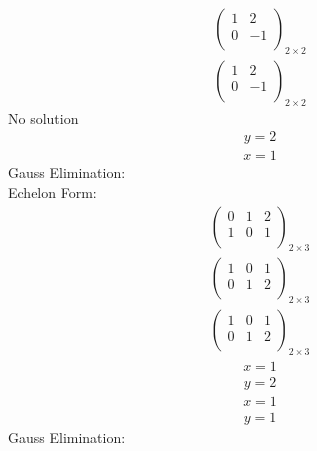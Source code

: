 \documentclass{article}
\begin{document}
\begin{align*}
\left(
\begin{array}{c|c}
1 & 2\\
0 & -1\\
\end{array}
\right)_{2\times 2}
\end{align*}
\begin{align*}
\left(
\begin{array}{c|c}
1 & 2\\
0 & -1\\
\end{array}
\right)_{2\times 2}
\end{align*}
No solution\\
\begin{align*}
y=2\end{align*}
\begin{align*}
x=1\end{align*}
Gauss Elimination:\\
Echelon Form:\\
\begin{align*}
\left(
\begin{array}{cc|c}
0 & 1 & 2\\
1 & 0 & 1\\
\end{array}
\right)_{2\times 3}
\end{align*}
\begin{align*}
\left(
\begin{array}{cc|c}
1 & 0 & 1\\
0 & 1 & 2\\
\end{array}
\right)_{2\times 3}
\end{align*}
\begin{align*}
\left(
\begin{array}{cc|c}
1 & 0 & 1\\
0 & 1 & 2\\
\end{array}
\right)_{2\times 3}
\end{align*}
\begin{align*}
x=1\end{align*}
\begin{align*}
y=2\end{align*}
\begin{align*}
x=1\end{align*}
\begin{align*}
y=1\end{align*}
Gauss Elimination:\\
\end{document}
